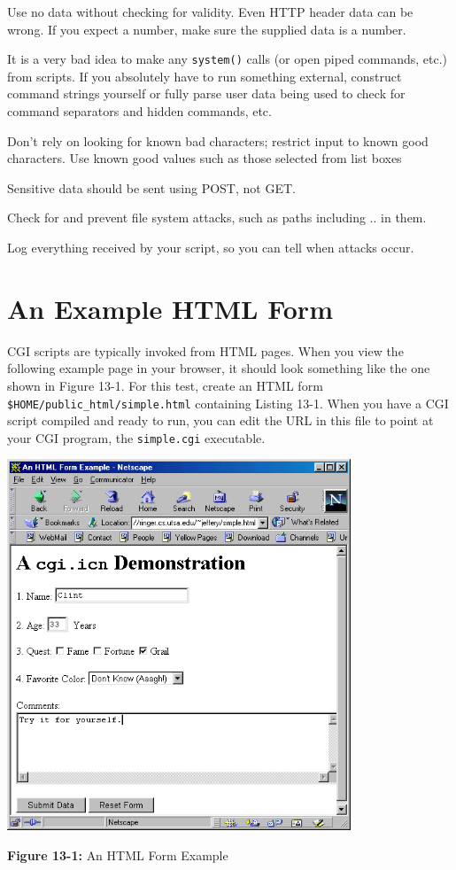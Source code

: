 {\newenvironment{itemize*}%
  {\begin{itemize}%
    \setlength{\itemsep}{0pt}%
    \setlength{\parskip}{0pt}}%
  {\end{itemize}}
\begin{itemize*}
\item Use no data without checking for validity. Even HTTP header data
can be wrong. If you expect a number, make sure the supplied data
is a number.
\item It is a very bad idea to make any \texttt{system()} calls (or open
piped commands, etc.) from scripts. If you absolutely have to run something
external, construct command strings yourself or fully parse user data being
used to check for command separators and hidden commands, etc.
\item Don't rely on looking for known bad characters; restrict input to
known good characters. Use known good values such as those selected from
list boxes
\item Sensitive data should be sent using POST, not GET.
\item Check for and prevent file system attacks, such as
paths including .. in them.
\item Log everything received by your script, so you can
tell when attacks occur.
\end{itemize*}

\section{An Example HTML Form}

CGI scripts are typically invoked from HTML pages.
When you view the following example page in your browser,
it should look something like the one shown in Figure 13-1.
For this test, create an HTML form \texttt{\$HOME/public\_html/simple.html}
containing Listing 13-1. When you have a CGI script compiled and ready to
run, you can edit the URL in this file to point at your CGI program, the
\texttt{simple.cgi} executable.
\begin{center}
\includegraphics[width=4.05in,height=4.36in]{ub-img/ub-img44.png}
\end{center}
{\sffamily\bfseries Figure 13-1:}
{\sffamily An HTML Form Example}


}
